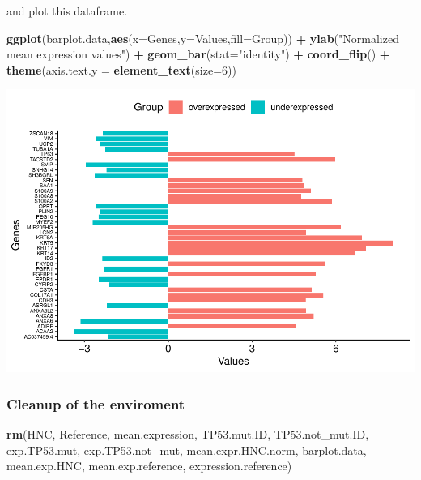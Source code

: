 \documentclass[]{article}
\newenvironment{Shaded}{\begin{snugshade}}{\end{snugshade}}
\newcommand{\KeywordTok}[1]{\textcolor[rgb]{0.13,0.29,0.53}{\textbf{#1}}}
\newcommand{\DataTypeTok}[1]{\textcolor[rgb]{0.13,0.29,0.53}{#1}}
\newcommand{\DecValTok}[1]{\textcolor[rgb]{0.00,0.00,0.81}{#1}}
\newcommand{\StringTok}[1]{\textcolor[rgb]{0.31,0.60,0.02}{#1}}
\newcommand{\OperatorTok}[1]{\textcolor[rgb]{0.81,0.36,0.00}{\textbf{#1}}}
\newcommand{\NormalTok}[1]{#1}
\begin{document}
and plot this dataframe.

\begin{Shaded}
\begin{Highlighting}[]
\KeywordTok{ggplot}\NormalTok{(barplot.data,}\KeywordTok{aes}\NormalTok{(}\DataTypeTok{x=}\NormalTok{Genes,}\DataTypeTok{y=}\NormalTok{Values,}\DataTypeTok{fill=}\NormalTok{Group)) }\OperatorTok{+}
\StringTok{  }\KeywordTok{ylab}\NormalTok{(}\StringTok{"Normalized mean expression values"}\NormalTok{) }\OperatorTok{+}
\StringTok{  }\KeywordTok{geom_bar}\NormalTok{(}\DataTypeTok{stat=}\StringTok{"identity"}\NormalTok{) }\OperatorTok{+}
\StringTok{  }\KeywordTok{coord_flip}\NormalTok{() }\OperatorTok{+}
\StringTok{  }\KeywordTok{theme}\NormalTok{(}\DataTypeTok{axis.text.y =} \KeywordTok{element_text}\NormalTok{(}\DataTypeTok{size=}\DecValTok{6}\NormalTok{))}
\end{Highlighting}
\end{Shaded}

\includegraphics{Project_HNC_files/figure-latex/1_expression_plot4-1.pdf}

\subsubsection{Cleanup of the
enviroment}\label{cleanup-of-the-enviroment}

\begin{Shaded}
\begin{Highlighting}[]
\KeywordTok{rm}\NormalTok{(HNC, Reference, mean.expression, TP53.mut.ID, TP53.not_mut.ID, exp.TP53.mut, exp.TP53.not_mut, mean.expr.HNC.norm, barplot.data, mean.exp.HNC, mean.exp.reference, expression.reference)}
\end{Highlighting}
\end{Shaded}
\end{document}
